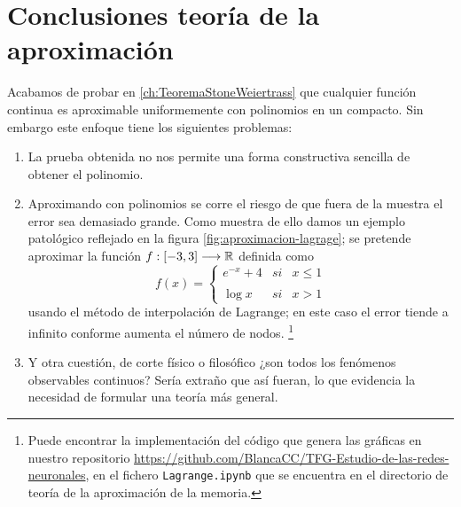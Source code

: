 \section{Conclusiones teoría de la aproximación} 

Acabamos de probar en \ref{ch:TeoremaStoneWeiertrass} que cualquier función 
continua es aproximable uniformemente con polinomios en un compacto. 
Sin embargo este enfoque tiene los siguientes problemas: 

\begin{enumerate}
    \item La prueba obtenida no nos permite 
    una forma constructiva sencilla de obtener el polinomio. 
    \item Aproximando con polinomios se corre el riesgo de que fuera de la muestra 
    el error sea demasiado grande. Como muestra de ello damos un ejemplo patológico 
    reflejado en la figura \ref{fig:aproximacion-lagrage}; se pretende aproximar 
    la función $f:[-3,3] \longrightarrow \mathbb{R}$ definida como
    \begin{equation*}
        f(x)= \left\{ \begin{array}{lcc}
            e^{-x} + 4 &   si  & x \leq 1 \\
            \\ \log{x} &  si  & x > 1
            \end{array}
  \right.
    \end{equation*}
    usando el método de interpolación de Lagrange; en este caso el error tiende a 
    infinito conforme aumenta el número de nodos. \footnote{Puede encontrar la implementación
    del código que genera las gráficas en nuestro repositorio 
    \url{https://github.com/BlancaCC/TFG-Estudio-de-las-redes-neuronales}, 
    en el fichero \texttt{Lagrange.ipynb} que se encuentra  en el directorio de teoría de la aproximación de la memoria. } 

    \item Y otra cuestión, de corte físico o  filosófico ¿son todos los fenómenos observables continuos? 
    Sería extraño que así fueran, lo que evidencia la necesidad de formular una teoría más general. 
\end{enumerate}

